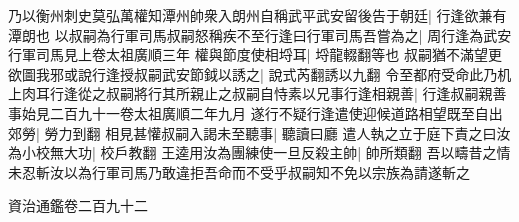 乃以衡州刺史莫弘萬權知潭州帥衆入朗州自稱武平武安留後告于朝廷|{
	行逢欲兼有潭朗也}
以叔嗣為行軍司馬叔嗣怒稱疾不至行逢曰行軍司馬吾嘗為之|{
	周行逢為武安行軍司馬見上卷太祖廣順三年}
權與節度使相埒耳|{
	埒龍輟翻等也}
叔嗣猶不滿望更欲圖我邪或說行逢授叔嗣武安節鉞以誘之|{
	說式芮翻誘以九翻}
令至都府受命此乃机上肉耳行逢從之叔嗣將行其所親止之叔嗣自恃素以兄事行逢相親善|{
	行逢叔嗣親善事始見二百九十一卷太祖廣順二年九月}
遂行不疑行逢遣使迎候道路相望既至自出郊勞|{
	勞力到翻}
相見甚懽叔嗣入謁未至聽事|{
	聽讀曰廳}
遣人執之立于庭下責之曰汝為小校無大功|{
	校戶教翻}
王逵用汝為團練使一旦反殺主帥|{
	帥所類翻}
吾以疇昔之情未忍斬汝以為行軍司馬乃敢違拒吾命而不受乎叔嗣知不免以宗族為請遂斬之

資治通鑑卷二百九十二
